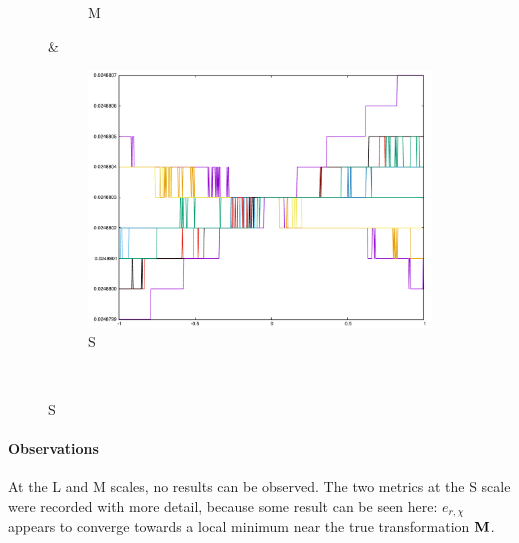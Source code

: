 {\begin{figure}[H]
\begin{subfigure}{.33\textwidth}
	\caption{M}
\end{subfigure}&
\begin{subfigure}{.33\textwidth}
	\includegraphics[width=\linewidth]{fig/ajherr/t3rr/S_mae.pdf}
	\caption{S}
\end{subfigure}\\
\end{figure}


\paragraph{Observations} At the L and M scales, no results can be observed. The two metrics at the S scale were recorded with more detail, because some result can be seen here: $e_{r,\chi}$ appears to converge towards a local minimum near the true transformation $\mathbf{M}$.


}